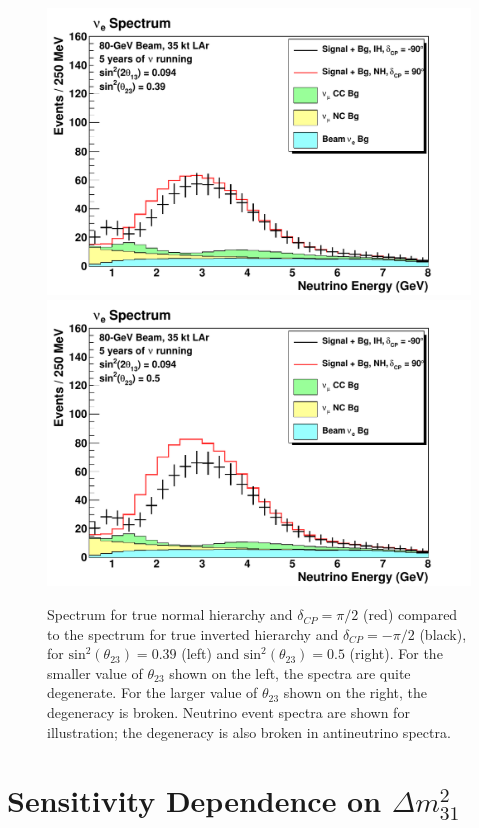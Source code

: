 \documentclass[letterpaper,11pt]{article}
\newcommand{\sthetatwothree}{\mbox{$\mathrm{sin}^2(\theta_{23})$}}
\newcommand{\thetatwothree}{\mbox{$\theta_{23}$}}
\newcommand{\dcp}{\mbox{$\delta_{CP}$}}
\newcommand{\Dmsq}{\mbox{$\Delta m^{2}_{31}$}}
\begin{document}
%
\begin{figure}[!htbp]
\centering
\includegraphics[width=0.45\linewidth]{figs/spec_nh90_ih-90_80gev.pdf}
\includegraphics[width=0.45\linewidth]{figs/spec_nh90_ih-90_80gev_th23max.pdf}
\caption{Spectrum for true normal hierarchy and $\dcp=\pi/2$ (red) compared to the
spectrum for true inverted hierarchy and $\dcp=-\pi/2$ (black), 
for $\sthetatwothree=0.39$
(left) and $\sthetatwothree=0.5$ (right). For the smaller value of $\thetatwothree$
shown on the left, the spectra are quite degenerate. For the larger value 
of $\thetatwothree$ shown on the right, the degeneracy is broken.
Neutrino event spectra are shown for illustration; the degeneracy is also broken
in antineutrino spectra.}
\label{fig:degspec}
\end{figure}

\section{Sensitivity Dependence on $\Dmsq$}
\label{sect:Dmsq}
\end{document}

